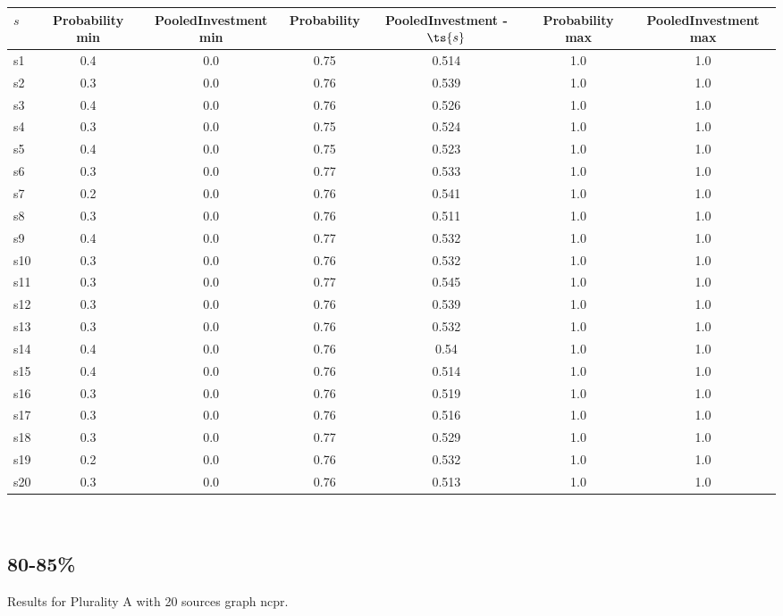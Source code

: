 \documentclass{article}
\begin{document}
\noindent\begin{tabular}{|l|c|c|c|c|c|c|}
\hline
$s$& Probability min & PooledInvestment min & Probability & PooledInvestment - $\ts{s}$ & Probability max & PooledInvestment max\\
\hline
s1 &0.4 & 0.0 & 0.75 & 0.514 & 1.0 & 1.0\\
\hline
s2 &0.3 & 0.0 & 0.76 & 0.539 & 1.0 & 1.0\\
\hline
s3 &0.4 & 0.0 & 0.76 & 0.526 & 1.0 & 1.0\\
\hline
s4 &0.3 & 0.0 & 0.75 & 0.524 & 1.0 & 1.0\\
\hline
s5 &0.4 & 0.0 & 0.75 & 0.523 & 1.0 & 1.0\\
\hline
s6 &0.3 & 0.0 & 0.77 & 0.533 & 1.0 & 1.0\\
\hline
s7 &0.2 & 0.0 & 0.76 & 0.541 & 1.0 & 1.0\\
\hline
s8 &0.3 & 0.0 & 0.76 & 0.511 & 1.0 & 1.0\\
\hline
s9 &0.4 & 0.0 & 0.77 & 0.532 & 1.0 & 1.0\\
\hline
s10 &0.3 & 0.0 & 0.76 & 0.532 & 1.0 & 1.0\\
\hline
s11 &0.3 & 0.0 & 0.77 & 0.545 & 1.0 & 1.0\\
\hline
s12 &0.3 & 0.0 & 0.76 & 0.539 & 1.0 & 1.0\\
\hline
s13 &0.3 & 0.0 & 0.76 & 0.532 & 1.0 & 1.0\\
\hline
s14 &0.4 & 0.0 & 0.76 & 0.54 & 1.0 & 1.0\\
\hline
s15 &0.4 & 0.0 & 0.76 & 0.514 & 1.0 & 1.0\\
\hline
s16 &0.3 & 0.0 & 0.76 & 0.519 & 1.0 & 1.0\\
\hline
s17 &0.3 & 0.0 & 0.76 & 0.516 & 1.0 & 1.0\\
\hline
s18 &0.3 & 0.0 & 0.77 & 0.529 & 1.0 & 1.0\\
\hline
s19 &0.2 & 0.0 & 0.76 & 0.532 & 1.0 & 1.0\\
\hline
s20 &0.3 & 0.0 & 0.76 & 0.513 & 1.0 & 1.0\\
\hline
\end{tabular}\\

\newpage

\subsection{80-85\%}

\noindent Results for Plurality A with 20 sources graph ncpr.
\end{document}
